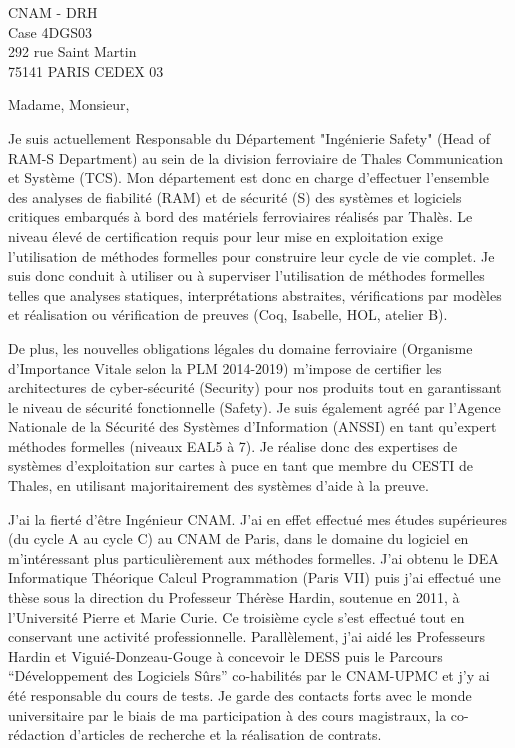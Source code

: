 \documentclass[a4paper,12pt]{lettre}
\begin{document}
 
\begin{letter}{
    CNAM - DRH\\
    Case 4DGS03\\
    292 rue Saint Martin\\ 
    75141 PARIS CEDEX 03}
  
\date{le 20 avril 2015} 
 
\def\concname{Objet :~}

\opening{Madame, Monsieur,}
 
 Je suis actuellement Responsable du D\'epartement "Ing\'enierie
 Safety" (Head of RAM-S Department) au sein de la division ferroviaire
 de Thales Communication et Syst\`eme (TCS). Mon d\'epartement est
 donc en charge d'effectuer l'ensemble des analyses de fiabilit\'e
 (RAM) et de s\'ecurit\'e (S) des syst\`emes et logiciels critiques
 embarqu\'es \`a bord des mat\'eriels ferroviaires r\'ealis\'es par
 Thal\`es. Le niveau \'elev\'e de certification requis pour leur mise
 en exploitation exige l'utilisation de m\'ethodes formelles pour
 construire leur cycle de vie complet. Je suis donc conduit \`a
 utiliser ou \`a superviser l'utilisation de m\'ethodes formelles
 telles que analyses statiques, interpr\'etations abstraites,
 v\'erifications par mod\`eles et r\'ealisation ou v\'erification de
 preuves (Coq, Isabelle, HOL, atelier B). 

De plus, les nouvelles obligations l\'egales du domaine ferroviaire
(Organisme d'Importance Vitale selon la PLM 2014-2019) m'impose de
certifier les architectures de cyber-s\'ecurit\'e (Security) pour nos
produits tout en garantissant le niveau de s\'ecurit\'e fonctionnelle
(Safety). Je suis \'egalement agr\'e\'e par l'Agence Nationale de la
S\'ecurit\'e des Syst\`emes d'Information (ANSSI) en tant qu'expert
m\'ethodes formelles (niveaux EAL5 \`a 7). Je r\'ealise donc des
expertises de syst\`emes d'exploitation sur cartes \`a puce en tant
que membre du CESTI de Thales, en utilisant majoritairement des
syst\`emes d'aide \`a la preuve.

J'ai la fiert\'e d'\^etre Ing\'enieur CNAM. J'ai en effet effectu\'e
mes \'etudes sup\'erieures (du cycle A au cycle C) au CNAM de Paris,
dans le domaine du logiciel en m'int\'eressant plus particuli\`erement
aux m\'ethodes formelles. J'ai obtenu le DEA Informatique Th\'eorique
Calcul Programmation (Paris VII) puis j'ai effectu\'e une th\`ese sous
la direction du Professeur Th\'er\`ese Hardin, soutenue en 2011, \`a
l'Universit\'e Pierre et Marie Curie. Ce troisi\`eme cycle s'est
effectu\'e tout en conservant une activit\'e
professionnelle. Parall\`element, j'ai aid\'e les Professeurs Hardin
et Vigui\'e-Donzeau-Gouge \`a concevoir le DESS puis le Parcours
``D\'eveloppement des Logiciels S\^urs'' co-habilit\'es par le CNAM-UPMC
et j'y ai \'et\'e responsable du cours de tests. Je garde des contacts
forts avec le monde universitaire par le biais de ma participation \`a
des cours magistraux, la co-r\'edaction d'articles de recherche et la
r\'ealisation de contrats.


\end{letter}
\end{document}
